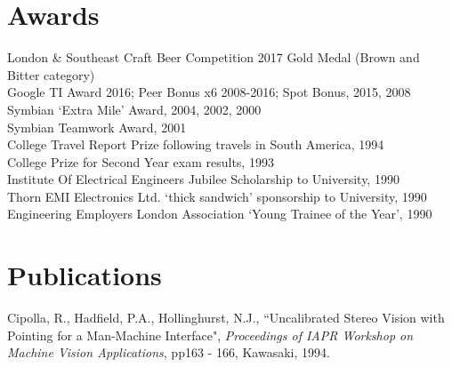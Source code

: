 \documentclass[line]{resume}
\begin{document}
\begin{resume}
    \section{\mysidestyle Awards} 

    London \& Southeast Craft Beer Competition 2017 Gold Medal (Brown and Bitter category)            \vspace{0.5mm}\\%
    Google TI Award 2016; Peer Bonus x6 2008-2016; Spot Bonus, 2015, 2008                             \vspace{0.5mm}\\%
    Symbian `Extra Mile' Award, 2004, 2002, 2000                                                      \vspace{0.5mm}\\%
    Symbian Teamwork Award, 2001                                                                      \vspace{0.5mm}\\%
    College Travel Report Prize following travels in South America, 1994                              \vspace{0.5mm}\\%
    College Prize for Second Year exam results, 1993                                                  \vspace{0.5mm}\\%
    Institute Of Electrical Engineers Jubilee Scholarship to University, 1990                         \vspace{0.5mm}\\%
    Thorn EMI Electronics Ltd. `thick sandwich' sponsorship to University, 1990                       \vspace{0.5mm}\\%
    Engineering Employers London Association `Young Trainee of the Year', 1990

    \section{\mysidestyle Publications}

    Cipolla, R., Hadfield, P.A., Hollinghurst, N.J.,
    ``Uncalibrated Stereo Vision with Pointing for a Man-Machine Interface",
    \textsl{Proceedings of IAPR Workshop on Machine Vision Applications}, pp163 - 166, Kawasaki, 1994.


\end{resume}
\end{document}
